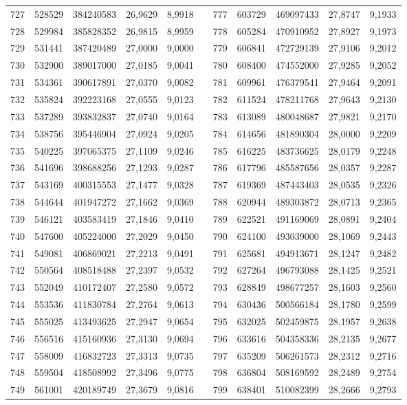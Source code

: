 \begin{longtable}{rrrrrrrrrrr}
727&528529&384240583&26,9629&8,9918&&777&603729&469097433&27,8747&9,1933\\
728&529984&385828352&26,9815&8,9959&&778&605284&470910952&27,8927&9,1973\\
729&531441&387420489&27,0000&9,0000&&779&606841&472729139&27,9106&9,2012\\
730&532900&389017000&27,0185&9,0041&&780&608400&474552000&27,9285&9,2052\\
731&534361&390617891&27,0370&9,0082&&781&609961&476379541&27,9464&9,2091\\
732&535824&392223168&27,0555&9,0123&&782&611524&478211768&27,9643&9,2130\\
733&537289&393832837&27,0740&9,0164&&783&613089&480048687&27,9821&9,2170\\
734&538756&395446904&27,0924&9,0205&&784&614656&481890304&28,0000&9,2209\\
735&540225&397065375&27,1109&9,0246&&785&616225&483736625&28,0179&9,2248\\
736&541696&398688256&27,1293&9,0287&&786&617796&485587656&28,0357&9,2287\\
737&543169&400315553&27,1477&9,0328&&787&619369&487443403&28,0535&9,2326\\
738&544644&401947272&27,1662&9,0369&&788&620944&489303872&28,0713&9,2365\\
739&546121&403583419&27,1846&9,0410&&789&622521&491169069&28,0891&9,2404\\
740&547600&405224000&27,2029&9,0450&&790&624100&493039000&28,1069&9,2443\\
741&549081&406869021&27,2213&9,0491&&791&625681&494913671&28,1247&9,2482\\
742&550564&408518488&27,2397&9,0532&&792&627264&496793088&28,1425&9,2521\\
743&552049&410172407&27,2580&9,0572&&793&628849&498677257&28,1603&9,2560\\
744&553536&411830784&27,2764&9,0613&&794&630436&500566184&28,1780&9,2599\\
745&555025&413493625&27,2947&9,0654&&795&632025&502459875&28,1957&9,2638\\
746&556516&415160936&27,3130&9,0694&&796&633616&504358336&28,2135&9,2677\\
747&558009&416832723&27,3313&9,0735&&797&635209&506261573&28,2312&9,2716\\
748&559504&418508992&27,3496&9,0775&&798&636804&508169592&28,2489&9,2754\\
749&561001&420189749&27,3679&9,0816&&799&638401&510082399&28,2666&9,2793\\

\end{longtable}
